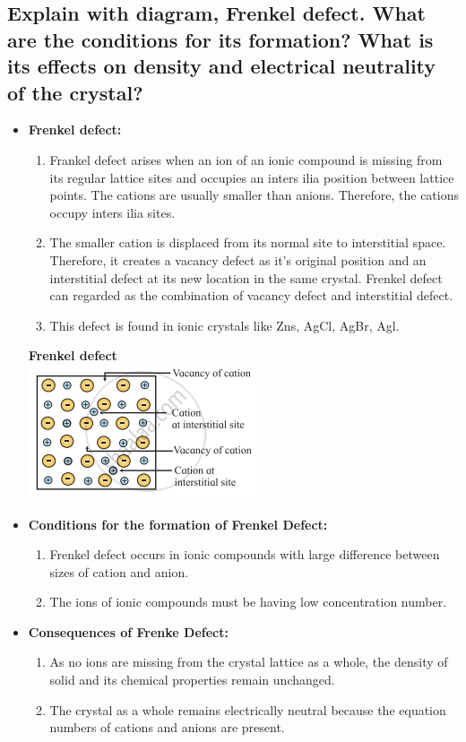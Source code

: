 \documentclass{article}
\begin{document}
   \subsection{Explain with diagram, Frenkel defect. What are the
   conditions for its formation? What is its effects on density and
   electrical neutrality of the crystal?}

   \begin{itemize}
   \item \textbf{Frenkel defect:}
	 \begin{enumerate}
	 \item Frankel defect arises when an ion of an ionic compound is
	 missing from its regular lattice sites and occupies an
	 inters ilia position between lattice points. The cations are
	 usually smaller than anions. Therefore, the cations occupy
	 inters ilia sites.
	 \item The smaller cation is displaced from its normal site
	 to interstitial space. Therefore, it creates a vacancy defect
	 as it's original position and an interstitial defect at its
	 new location in the same crystal. Frenkel defect can regarded
	 as the combination of vacancy defect and interstitial defect.
	 \item This defect is found in ionic crystals like Zns, AgCl,
	 AgBr, Agl.
	 \end{enumerate}
   \textbf{Frenkel defect}\\
   \includegraphics[scale=0.5]{frenkel}
   \item \textbf{Conditions for the formation of Frenkel Defect:}
	 \begin{enumerate}
	 \item Frenkel defect occurs in ionic compounds with large
	 difference between sizes of cation and anion.
	 \item The ions of ionic compounds must be having low
	 concentration number.
	 \end{enumerate}
   \item \textbf{Consequences of Frenke Defect:}
	 \begin{enumerate}
	 \item As no ions are missing from the crystal lattice as a
	 whole, the density of solid and its chemical properties remain
	 unchanged.
	 \item The crystal as a whole remains electrically neutral
	 because the equation numbers of cations and anions are
	 present.
	 \end{enumerate}
   \end{itemize}
\end{document}

